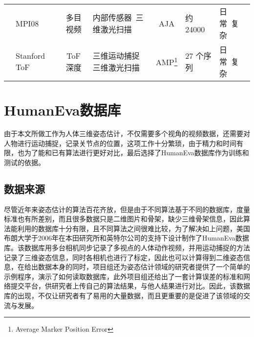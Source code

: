 \begin{table}[htbp]
\begin{minipage}[t]{\linewidth}
\begin{tabular}{c|p{7em}<{\centering}cp{6em}<{\centering}cp{5em}<{\centering}p{3em}<{\centering}}
      & MPI08~\cite{pons2010multisensor} & 多目视频 & 内部传感器\ 三维激光扫描 & AJA & 约24000 & 日常\ 复杂\\
      & Stanford ToF~\cite{ganapathi2010real} & ToF 深度 & 三维运动捕捉 三维激光扫描 & AMP\footnote{Average Marker Position Error} & 27 个序列 & 日常\ 复杂\\
      \bottomrule[1.5pt]
    \end{tabular}
    \end{minipage}
\end{table}

\section{HumanEva数据库}
\label{sec:HumanEva}
由于本文所做工作为人体三维姿态估计，不仅需要多个视角的视频数据，还需要对人物进行运动捕捉，记录关节点的位置，这项工作十分繁琐，由于精力和时间有限，也为了能和已有算法进行更好对比，最后选择了HumanEva数据库作为训练和测试的依据。
\subsection{数据来源}
尽管近年来姿态估计的算法百花齐放，但是由于不同算法基于不同的数据库，度量标准也有所差别，而且很多数据只是二维图片和骨架，缺少三维骨架信息，因此算法能利用的数据库十分有限，且不同算法之间很难比较，为了解决如上问题，美国布朗大学于2006年在本田研究所和英特尔公司的支持下设计制作了HumanEva数据库。该数据库用多台相机同步记录了多视点的人体动作视频，并用运动捕捉的方法记录了三维姿态信息，同时各相机也进行了标定，因此也可以计算得到二维姿态信息，在给出数据本身的同时，项目组还为姿态估计领域的研究者提供了一个简单的示例程序，演示了如何读取数据库，此外项目组还给出了一套计算误差的标准和网络提交平台，供研究者上传自己的算法结果，与他人结果进行对比。因此，该数据库的出现，不仅让研究者有了易用的大量数据，而且更重要的是促进了该领域的交流与发展。

